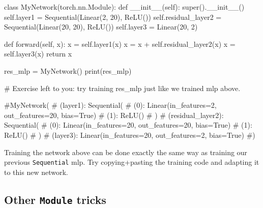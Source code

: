 \begin{codeblock}[language=python]
class MyNetwork(torch.nn.Module):
def __init__(self):
    super().__init__()
    self.layer1 = Sequential(Linear(2, 20), ReLU())
    self.residual_layer2 = Sequential(Linear(20, 20), ReLU())
    self.layer3 = Linear(20, 2)
    
def forward(self, x):
    x = self.layer1(x)
    x = x + self.residual_layer2(x)
    x = self.layer3(x)
    return x

res_mlp = MyNetwork()
print(res_mlp)

# Exercise left to you: try training res_mlp just like we trained mlp above.


#MyNetwork(
#  (layer1): Sequential(
#    (0): Linear(in_features=2, out_features=20, bias=True)
#    (1): ReLU()
#  )
#  (residual_layer2): Sequential(
#    (0): Linear(in_features=20, out_features=20, bias=True)
#    (1): ReLU()
#  )
#  (layer3): Linear(in_features=20, out_features=2, bias=True)
#)
 \end{codeblock}
 
 Training the network above can be done exactly the same way as training our previous \texttt{Sequential} mlp. Try copying+pasting the training code and adapting it to this new network. 

 \subsection{Other \texttt{Module} tricks}


